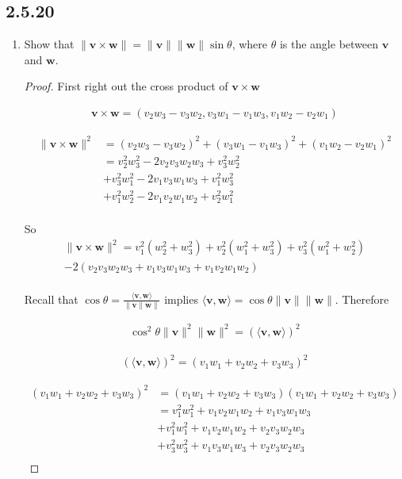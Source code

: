 \documentclass{tufte-book}
\newcommand{\vct}{\mathbf}
\newcommand{\dprod}[2]{\langle #1, #2 \rangle}
\theoremstyle{mytheoremstyle}
\theoremstyle{mylemstyle}
\theoremstyle{mydefstyle}
\begin{document}
\subsection{2.5.20}
\begin{enumerate}
\item Show that $\|\vct{v} \times \vct{w} \| = \|\vct{v}\|\|\vct{w}\|\sin \theta$, where $\theta$ is the angle between $\vct{v}$ and $\vct{w}$.

\begin{proof}

First right out the cross product of $\vct{v} \times \vct{w}$

\begin{align}
\vct{v} \times \vct{w} = (v_2w_3 - v_3w_2, v_3w_1 - v_1w_3, v_1w_2 - v_2w_1)
\end{align}

\begin{align*}
\|\vct{v} \times \vct{w} \|^2 &= (v_2w_3 - v_3w_2)^2+(v_3w_1 - v_1w_3)^2+(v_1w_2 - v_2w_1)^2\\
&=v_2^2w_3^2 - 2v_2v_3w_2w_3 + v_3^2w_2^2 \\
&+ v_3^2w_1^2 - 2v_1v_3w_1w_3 + v_1^2w_3^2 \\
&+ v_1^2w_2^2 - 2v_1v_2w_1w_2 + v_2^2w_1^2 \\
\end{align*}

So
\begin{multline}
\|\vct{v} \times \vct{w} \|^2 = v_1^2(w_2^2 + w_3^2) + v_2^2(w_1^2+w_3^2) + v_3^2(w_1^2+w_2^2)\\ 
-2(v_2v_3w_2w_3 + v_1v_3w_1w_3 + v_1v_2w_1w_2)\\
\end{multline}

Recall that $\cos \theta = \frac{\dprod{\vct{v}}{\vct{w}}}{\|\vct{v}\|\vct{w}\|}$ implies $\dprod{\vct{v}}{\vct{w}} = \cos\theta \|\vct{v}\|\|\vct{w}\|$.  Therefore

\begin{align}
\cos^2\theta \|\vct{v}\|^2\|\vct{w}\|^2 = (\dprod{\vct{v}}{\vct{w}})^2
\end{align}

\begin{align}
(\dprod{\vct{v}}{\vct{w}})^2 = (v_1w_1 + v_2w_2 + v_3w_3)^2
\end{align}

\begin{align*}
(v_1w_1 + v_2w_2 + v_3w_3)^2 &= (v_1w_1 + v_2w_2 + v_3w_3)(v_1w_1 + v_2w_2 + v_3w_3)\\
&= v_1^2w_1^2 + v_1v_2w_1w_2 + v_1v_3w_1w_3 \\
&+ v_1^2w_1^2 + v_1v_2w_1w_2 + v_2v_3w_2w_3 \\
&+ v_3^2w_3^2 + v_1v_3w_1w_3 + v_2v_3w_2w_3 \\
\end{align*}


\end{proof}
\end{enumerate}
\end{document}

